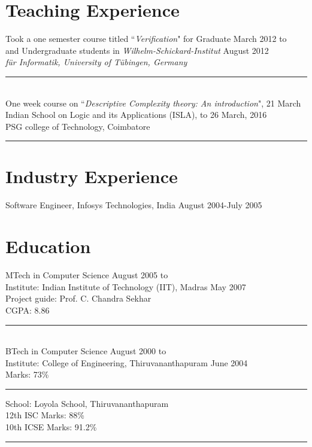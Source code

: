 \documentclass[margin]{res}
\begin{document}
\begin{resume}
\section{Teaching Experience}
					Took a one semester course titled ``\emph{Verification}" for Graduate \hfill March 2012 to  \\
					and Undergraduate students in \emph{Wilhelm-Schickard-Institut} \hfill August 2012\\ 
					\emph{f\"ur Informatik, University of T\"ubingen, Germany} \\
					\noindent\rule{13cm}{0.4pt} \\
					One week course on ``\emph{Descriptive Complexity theory: An introduction}", \hfill 21 March \\
					 Indian School on Logic and its Applications (ISLA),   \hfill to 26 March, 2016 \\
					 PSG college of Technology, Coimbatore \\
					\noindent\rule{13cm}{0.4pt} 

\section{Industry Experience}
Software Engineer, Infosys Technologies, India \hfill August 2004-July 2005

\section{Education} 
					MTech in Computer Science \hfill August 2005 to \\
					Institute: Indian Institute of Technology (IIT), Madras \hfill May 2007 \\
					Project guide: Prof. C. Chandra Sekhar \\
					CGPA: 8.86 \\
					\noindent\rule{13cm}{0.4pt} \\
					BTech in Computer Science \hfill August 2000 to \\
					Institute: College of Engineering, Thiruvananthapuram \hfill June 2004 \\
					Marks: 73\% \\
					\noindent\rule{13cm}{0.4pt} 
					School: Loyola School, Thiruvananthapuram \\
					12th ISC Marks: 88\% \\
					10th ICSE Marks: 91.2\% \\
					\noindent\rule{13cm}{0.4pt} 
					

\end{resume}
\end{document}
